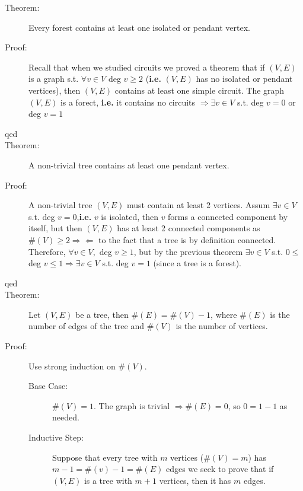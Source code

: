 \documentclass[10pt]{article}
\begin{document}
\begin{description}
\begin{enumerate}
\begin{figure}[h!]
			\end{figure}
		\end{enumerate}
		\item[Theorem:] Every forest contains at least one isolated or pendant vertex.
		\item[Proof:] Recall that when we studied circuits we proved a theorem that if $(V, E)$ is a graph s.t. $\forall v \in V$ deg $v \geq 2$ (\textbf{i.e.} $(V, E)$ has no isolated or pendant vertices), then $(V, E)$ contains at least one simple circuit. The graph $(V, E)$ is a forect, \textbf{i.e.} it contains no circuits $\Rightarrow \exists v \in V$ s.t. deg $v = 0$ or deg $v = 1$
		\item[qed]
		\item[Theorem:] A non-trivial tree contains at least one pendant vertex.
		\item[Proof:] A non-trivial tree $(V, E)$ must contain at least 2 vertices. Assum $\exists v \in V$ s.t. deg $v = 0$,\textbf{i.e.} $v$ is isolated, then $v$ forms a connected component by itself, but then $(V, E)$ has at least 2 connected components as $\#(V) \geq 2 \Rightarrow \Leftarrow$ to the fact that a tree is by definition connected. Therefore, $\forall v \in V,$ deg $v \geq 1$, but by the previous theorem $\exists v \in V$ s.t. $0 \leq$ deg $v \leq 1 \Rightarrow \exists v \in V$ s.t. deg $v = 1$ (since a tree is a forest).
		\item[qed]
		\item[Theorem:] Let $(V, E)$ be a tree, then $\# (E) = \# (V) - 1$, where $\#(E)$ is the number of edges of the tree and $\#(V)$ is the number of vertices.
		\item[Proof:] Use strong induction on $\#(V)$.
		\begin{description}
			\item[Base Case:] $\#(V) = 1$. The graph is trivial $\Rightarrow \#(E) = 0$, so $0 = 1-1$ as needed.
			\item[Inductive Step:] Suppose that every tree with $m$ vertices ($\# (V) = m$) has $m-1 = \#(v) -1 = \#(E)$ edges we seek to prove that if $(V, E)$ is a tree with $m+1$ vertices, then it has $m$ edges. \\

\end{description}
\end{description}
\end{document}

